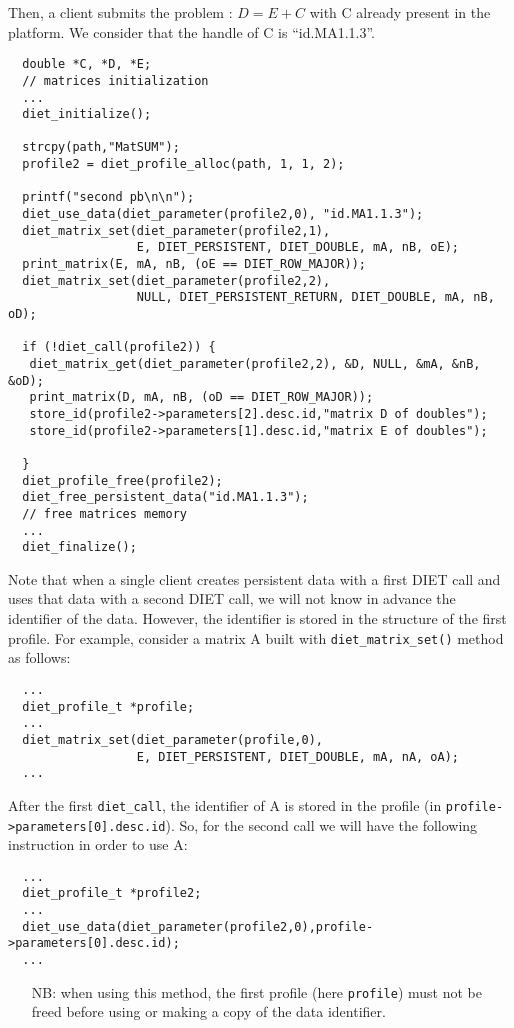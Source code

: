 Then, a client submits the problem : $D=E+C$ with C already present
in the platform. We consider that the handle of C is ``id.MA1.1.3''.

{\footnotesize
\begin{verbatim}
  double *C, *D, *E; 
  // matrices initialization
  ...
  diet_initialize();

  strcpy(path,"MatSUM");
  profile2 = diet_profile_alloc(path, 1, 1, 2);
  
  printf("second pb\n\n");
  diet_use_data(diet_parameter(profile2,0), "id.MA1.1.3");
  diet_matrix_set(diet_parameter(profile2,1),
                  E, DIET_PERSISTENT, DIET_DOUBLE, mA, nB, oE);
  print_matrix(E, mA, nB, (oE == DIET_ROW_MAJOR));
  diet_matrix_set(diet_parameter(profile2,2),
                  NULL, DIET_PERSISTENT_RETURN, DIET_DOUBLE, mA, nB, oD);
  
  if (!diet_call(profile2)) {
   diet_matrix_get(diet_parameter(profile2,2), &D, NULL, &mA, &nB, &oD);
   print_matrix(D, mA, nB, (oD == DIET_ROW_MAJOR));
   store_id(profile2->parameters[2].desc.id,"matrix D of doubles");
   store_id(profile2->parameters[1].desc.id,"matrix E of doubles");
  
  }
  diet_profile_free(profile2);
  diet_free_persistent_data("id.MA1.1.3");
  // free matrices memory
  ...
  diet_finalize();
\end{verbatim}
}  

Note that when a single client creates persistent data with a first
DIET call and uses that data with a second DIET call, we will not
know in advance the identifier of the data.  However, the identifier 
is stored in the structure of the first profile. For example,
consider a matrix A built with
\texttt{diet\_matrix\_set()} method as follows: {\footnotesize
\begin{verbatim}
  ...
  diet_profile_t *profile;
  ...
  diet_matrix_set(diet_parameter(profile,0),
                  E, DIET_PERSISTENT, DIET_DOUBLE, mA, nA, oA);
  ...
\end{verbatim}
} After the first \texttt{diet\_call}, the identifier of A is stored in
the profile (in \texttt{profile->parameters[0].desc.id}). So, for the
second call we will have the following instruction in order to use A:
{\footnotesize
\begin{verbatim}
  ...
  diet_profile_t *profile2;
  ...
  diet_use_data(diet_parameter(profile2,0),profile->parameters[0].desc.id);
  ...
\end{verbatim}
}

\begin{itemize}
\item[NB:] when using this method, the first profile (here
\texttt{profile}) must not be freed before using or making a copy of
the data identifier.
\end{itemize}
